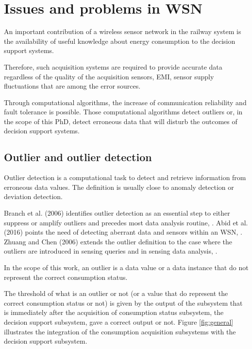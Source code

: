 
\section{Issues and problems in WSN}
An important contribution of a wireless sensor network in the railway system is the availability of useful knowledge about energy consumption to the decision support systems.

Therefore, such acquisition systems are required to provide accurate data regardless of the quality of the acquisition sensors, \ac{EMI}, sensor supply fluctuations that are among the error sources.

Through computational algorithms, the increase of communication reliability and fault tolerance is possible. Those computational algorithms detect outliers or, in the scope of this PhD, detect erroneous data that will disturb the outcomes of decision support systems. 



\subsection{Outlier and outlier detection}

\label{sec:def}
Outlier detection is a computational task to detect and retrieve information from erroneous data values. The definition is usually close to anomaly detection or deviation detection. 

Branch et al. (2006) identifies outlier detection as an essential step to either suppress or amplify outliers and precedes most data analysis routine, \cite{class:branch:2006}. Abid et al. (2016) points the need of detecting aberrant data and sensors within an \ac{WSN}, \cite{nn:abid:2016}.  Zhuang and Chen (2006) extends the outlier definition to the case where the outliers are introduced in sensing queries and in sensing data analysis, \cite{nn:zhuang:2006}.

\vspace{1em}

In the scope of this work, an outlier is a data value or a data instance that do not represent the correct consumption status.

The threshold of what is an outlier or not (or a value that do represent the correct consumption status or not) is given by the output of the subsystem that is immediately after the acquisition of consumption status subsystem, the decision support subsystem, gave a correct output or not. Figure \ref{fig:general} illustrates the integration of the consumption acquisition subsystems with the decision support subsystem.


